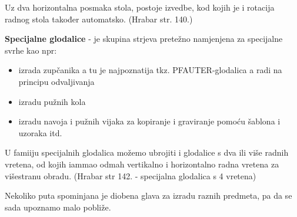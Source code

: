 \documentclass[a4paper,12pt]{article}
\numberwithin{figure}{section}
\begin{document}
Uz dva horizontalna posmaka stola, postoje izvedbe, kod kojih je i rotacija radnog stola također automatsko. (Hrabar str. 140.)\par
\textbf{Specijalne glodalice} - je skupina strjeva pretežno namjenjena za specijalne svrhe kao npr:
\begin{itemize}
\item izrada zupčanika a tu je najpoznatija tkz. PFAUTER-glodalica a radi na principu odvaljivanja
\item izradu pužnih kola
\item izradu navoja i pužnih vijaka
za kopiranje i graviranje pomoću šablona i uzoraka itd.
\end{itemize}
U famiiju specijalnih glodalica možemo ubrojiti i glodalice s dva ili više radnih vretena, od kojih iammao odmah vertikalno i horizontalno radna vretena za višestranu obradu. (Hrabar str 142. - specijalna glodalica s 4 vretena)\par
Nekoliko puta spominjana je diobena glava za izradu raznih predmeta, pa da se sada upoznamo malo pobliže.
\end{document}
